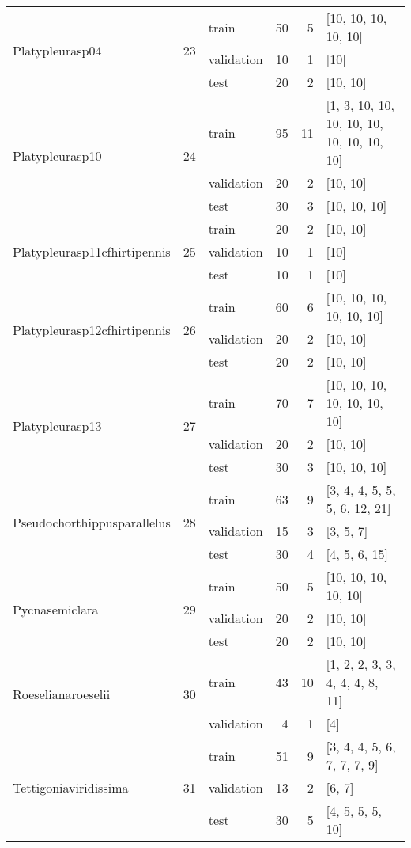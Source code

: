 \begin{longtable}{lrlrrl}
\midrule
\multirow{3}{*}{Platypleurasp04} & \multirow{3}{*}{23} & train & 50 & 5 & [10, 10, 10, 10, 10] \\
 &  & validation & 10 & 1 & [10] \\
 &  & test & 20 & 2 & [10, 10] \\
\midrule
\multirow{3}{*}{Platypleurasp10} & \multirow{3}{*}{24} & train & 95 & 11 & [1, 3, 10, 10, 10, 10, 10, 10, 10, 10, 10] \\
 &  & validation & 20 & 2 & [10, 10] \\
 &  & test & 30 & 3 & [10, 10, 10] \\
\midrule
\multirow{3}{*}{Platypleurasp11cfhirtipennis} & \multirow{3}{*}{25} & train & 20 & 2 & [10, 10] \\
 &  & validation & 10 & 1 & [10] \\
 &  & test & 10 & 1 & [10] \\
\midrule
\multirow{3}{*}{Platypleurasp12cfhirtipennis} & \multirow{3}{*}{26} & train & 60 & 6 & [10, 10, 10, 10, 10, 10] \\
 &  & validation & 20 & 2 & [10, 10] \\
 &  & test & 20 & 2 & [10, 10] \\
\midrule
\multirow{3}{*}{Platypleurasp13} & \multirow{3}{*}{27} & train & 70 & 7 & [10, 10, 10, 10, 10, 10, 10] \\
 &  & validation & 20 & 2 & [10, 10] \\
 &  & test & 30 & 3 & [10, 10, 10] \\
\midrule
\multirow{3}{*}{Pseudochorthippusparallelus} & \multirow{3}{*}{28} & train & 63 & 9 & [3, 4, 4, 5, 5, 5, 6, 12, 21] \\
 &  & validation & 15 & 3 & [3, 5, 7] \\
 &  & test & 30 & 4 & [4, 5, 6, 15] \\
\midrule
\multirow{3}{*}{Pycnasemiclara} & \multirow{3}{*}{29} & train & 50 & 5 & [10, 10, 10, 10, 10] \\
 &  & validation & 20 & 2 & [10, 10] \\
 &  & test & 20 & 2 & [10, 10] \\
\midrule
\multirow{2}{*}{Roeselianaroeselii} & \multirow{2}{*}{30} & train & 43 & 10 & [1, 2, 2, 3, 3, 4, 4, 4, 8, 11] \\
 &  & validation & 4 & 1 & [4] \\
\midrule
\multirow{3}{*}{Tettigoniaviridissima} & \multirow{3}{*}{31} & train & 51 & 9 & [3, 4, 4, 5, 6, 7, 7, 7, 9] \\
 &  & validation & 13 & 2 & [6, 7] \\
 &  & test & 30 & 5 & [4, 5, 5, 5, 10] \\
\end{longtable}

\normalsize